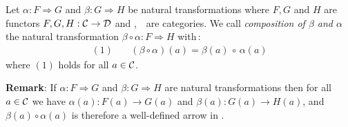 \begin{defin}\label{Nat:def:composition}
    Let $\alpha:F\Rightarrow G$ and $\beta:G\Rightarrow H$ be natural
    transformations where $F,G$ and $H$ are functors $F,G,H:\mbox{$\cal C$}\to\mbox{$\cal D$}$
    and \Cat,\ \Dat\ are categories. We call {\em composition of $\beta$
    and $\alpha$} the natural transformation $\beta\circ\alpha:F\Rightarrow H$
    with\,:
        \begin{eqnarray*}
            (1)&\ &(\beta\circ\alpha)(a)=\beta(a)\,\circ\,\alpha(a)
        \end{eqnarray*}
    where $(1)$ holds for all $a\in\mbox{$\cal C$}$.
\end{defin}

{\bf Remark}: If $\alpha:F\Rightarrow G$ and $\beta:G\Rightarrow H$ are 
natural transformations then for all $a\in\mbox{$\cal C$}$ we have $\alpha(a):F(a)\to 
G(a)$ and $\beta(a):G(a)\to H(a)$, and $\beta(a)\circ\alpha(a)$ is therefore 
a well-defined arrow in \Dat.

